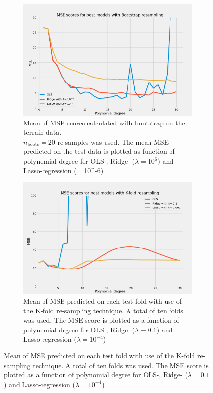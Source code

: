 \begin{figure}[H]
    \centering
    \begin{subfigure}[b]{0.49\textwidth}
        \includegraphics[width=\textwidth]{Figures/terrain_best_ols_ridge_lasso_boots.png}
        \caption{Mean of MSE scores calculated with bootstrap on the terrain data.\\ $n_{\text{boots}} =
        20$ re-samples was used. The mean MSE predicted on the test-data is plotted as
    function of polynomial degree for OLS-, Ridge- ($\lambda = 10^{6}$) and
Lasso-regression (\lambda = 10^{-6})   }  
    \end{subfigure}
    \begin{subfigure}[b]{0.49\textwidth}
        \includegraphics[width=\textwidth]{Figures/terrain_best_ols_ridge_lasso_kfold.png}
        \caption{Mean of MSE predicted on each test fold with use of the K-fold
        re-sampling technique. A total of ten folds was used. The MSE score is plotted as a function
    of polynomial degree for OLS-, Ridge- ($\lambda = 0.1$) and Lasso-regression
($\lambda = 10^{-4}$)}  
    \end{subfigure}
\end{figure}



